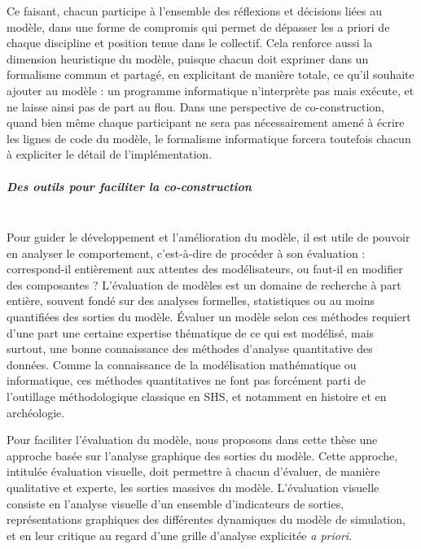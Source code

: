 Ce faisant, chacun participe à l'ensemble des réflexions et décisions liées au modèle, dans une forme de compromis qui permet de dépasser les a priori de chaque discipline et position tenue dans le collectif.
Cela renforce aussi la dimension heuristique du modèle, puisque chacun doit exprimer dans un formalisme commun et partagé, en explicitant de manière totale, ce qu'il souhaite ajouter au modèle : un programme informatique n'interprète pas mais exécute, et ne laisse ainsi pas de part au flou.
Dans une perspective de co-construction, quand bien même chaque participant ne sera pas nécessairement amené à écrire les lignes de code du modèle, le formalisme informatique forcera toutefois chacun à expliciter le détail de l'implémentation.

\subparagraph{Des outils pour faciliter la co-construction}~\\
Pour guider le développement et l'amélioration du modèle, il est utile de pouvoir en analyser le comportement, c'est-à-dire de procéder à son évaluation : correspond-il entièrement aux attentes des modélisateurs, ou faut-il en modifier des composantes ? 
L'évaluation de modèles est un domaine de recherche à part entière, souvent fondé sur des analyses formelles, statistiques ou au moins quantifiées des sorties du modèle.
Évaluer un modèle selon ces méthodes requiert d'une part une certaine expertise thématique de ce qui est modélisé, mais surtout, une bonne connaissance des méthodes d'analyse quantitative des données.
Comme la connaissance de la modélisation mathématique ou informatique, ces méthodes quantitatives ne font pas forcément parti de l'outillage méthodologique classique en SHS, et notamment en histoire et en archéologie.

Pour faciliter l'évaluation du modèle, nous proposons dans cette thèse une approche basée sur l'analyse graphique des sorties du modèle.
Cette approche, intitulée \og évaluation visuelle\fg{}, doit permettre à chacun d'évaluer, de manière qualitative et experte, les sorties massives du modèle.
L'évaluation visuelle consiste en l'analyse visuelle d'un ensemble d'indicateurs de sorties, représentations graphiques des différentes dynamiques du modèle de simulation, et en leur critique au regard d'une grille d'analyse explicitée \textit{a priori}.

